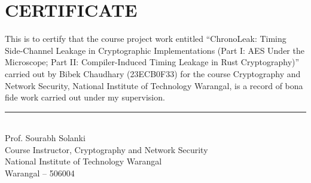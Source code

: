 \chapter*{\normalsize CERTIFICATE}

\noindent This is to certify that the course project work entitled ``ChronoLeak: Timing Side-Channel Leakage in Cryptographic Implementations (Part I: AES Under the Microscope; Part II: Compiler-Induced Timing Leakage in Rust Cryptography)'' carried out by Bibek Chaudhary (23ECB0F33) for the course Cryptography and Network Security, National Institute of Technology Warangal, is a record of bona fide work carried out under my supervision.

\vspace{2.8cm}
\noindent\rule{6.5cm}{0.4pt}\\
Prof. Sourabh Solanki\\
Course Instructor, Cryptography and Network Security\\
National Institute of Technology Warangal\\
Warangal -- 506004
\clearpage
